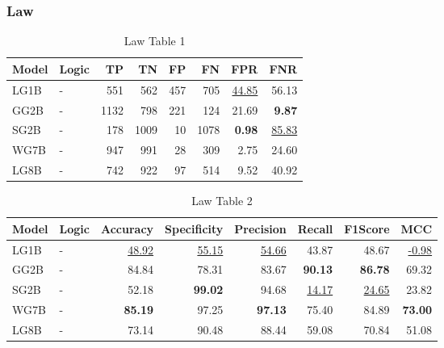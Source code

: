 \documentclass{article}
\begin{document}

\subsubsection{Law}

\begin{table}[H]
\centering
\begin{tabular}{llrrrrrr}
\toprule
 Model          & Logic   &   TP &   TN &   FP &   FN &   FPR &   FNR \\
\midrule

 LG1B    & -       &  551 &  562 &  457 &  705 & \underline{44.85} & 56.13             \\
 GG2B    & -       & 1132 &  798 &  221 &  124 & 21.69             & \textbf{9.87}     \\
 SG2B    & -       &  178 & 1009 &   10 & 1078 & \textbf{0.98}     & \underline{85.83} \\
 WG7B    & -       &  947 &  991 &   28 &  309 & 2.75              & 24.60             \\
 LG8B    & -       &  742 &  922 &   97 &  514 & 9.52              & 40.92             \\

\bottomrule
\end{tabular}
\caption{\label{tab:widgets}Law Table 1}
\end{table}

\begin{table}[H]
\begin{tabular}{llrrrrrr}
\toprule
 Model          & Logic   &   Accuracy &   Specificity &   Precision &   Recall &   F1Score &      MCC \\
\midrule

 LG1B    & -       & \underline{48.92} & \underline{55.15} & \underline{54.66} & 43.87             & 48.67             & \underline{-0.98} \\
 GG2B    & -       & 84.84             & 78.31             & 83.67             & \textbf{90.13}    & \textbf{86.78}    & 69.32             \\
 SG2B    & -       & 52.18             & \textbf{99.02}    & 94.68             & \underline{14.17} & \underline{24.65} & 23.82             \\
 WG7B    & -       & \textbf{85.19}    & 97.25             & \textbf{97.13}    & 75.40             & 84.89             & \textbf{73.00}    \\
 LG8B    & -       & 73.14             & 90.48             & 88.44             & 59.08             & 70.84             & 51.08             \\

\bottomrule
\end{tabular}
\caption{\label{tab:xstest2}Law Table 2}
\end{table}
\end{document}

